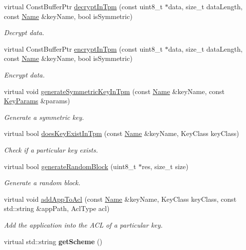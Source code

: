 \begin{DoxyCompactItemize}
virtual Const\+Buffer\+Ptr \hyperlink{classndn_1_1security_1_1DummyTpm_ad1fdb644ca478174ba9a33a51b3535a7}{decrypt\+In\+Tpm} (const uint8\+\_\+t $\ast$data, size\+\_\+t data\+Length, const \hyperlink{classndn_1_1Name}{Name} \&key\+Name, bool is\+Symmetric)
\begin{DoxyCompactList}\small\item\em Decrypt data. \end{DoxyCompactList}\item 
virtual Const\+Buffer\+Ptr \hyperlink{classndn_1_1security_1_1DummyTpm_a039574d8830538d3b928f2718a067f7e}{encrypt\+In\+Tpm} (const uint8\+\_\+t $\ast$data, size\+\_\+t data\+Length, const \hyperlink{classndn_1_1Name}{Name} \&key\+Name, bool is\+Symmetric)
\begin{DoxyCompactList}\small\item\em Encrypt data. \end{DoxyCompactList}\item 
virtual void \hyperlink{classndn_1_1security_1_1DummyTpm_a0d720fee8eedc897f6e70d9ea6c60fd0}{generate\+Symmetric\+Key\+In\+Tpm} (const \hyperlink{classndn_1_1Name}{Name} \&key\+Name, const \hyperlink{classndn_1_1KeyParams}{Key\+Params} \&params)
\begin{DoxyCompactList}\small\item\em Generate a symmetric key. \end{DoxyCompactList}\item 
virtual bool \hyperlink{classndn_1_1security_1_1DummyTpm_a48e6cc344ff37a45ad506bf1f8ba261b}{does\+Key\+Exist\+In\+Tpm} (const \hyperlink{classndn_1_1Name}{Name} \&key\+Name, Key\+Class key\+Class)
\begin{DoxyCompactList}\small\item\em Check if a particular key exists. \end{DoxyCompactList}\item 
virtual bool \hyperlink{classndn_1_1security_1_1DummyTpm_a0cb25faf386b5a6c7972bbf0693ce343}{generate\+Random\+Block} (uint8\+\_\+t $\ast$res, size\+\_\+t size)
\begin{DoxyCompactList}\small\item\em Generate a random block. \end{DoxyCompactList}\item 
virtual void \hyperlink{classndn_1_1security_1_1DummyTpm_a259b93001e33716962f2a72c771e3d07}{add\+App\+To\+Acl} (const \hyperlink{classndn_1_1Name}{Name} \&key\+Name, Key\+Class key\+Class, const std\+::string \&app\+Path, Acl\+Type acl)
\begin{DoxyCompactList}\small\item\em Add the application into the A\+CL of a particular key. \end{DoxyCompactList}\item 
virtual std\+::string {\bfseries get\+Scheme} ()\hypertarget{classndn_1_1security_1_1DummyTpm_a5a41a51df170cf18e42c12fd0863ed23}{}\label{classndn_1_1security_1_1DummyTpm_a5a41a51df170cf18e42c12fd0863ed23}

\end{DoxyCompactItemize}

